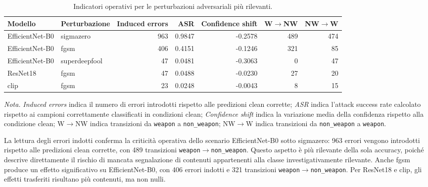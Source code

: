 \begin{table}[H]
\centering
\scriptsize
\setlength{\tabcolsep}{3.5pt}
\renewcommand{\arraystretch}{1.15}
\caption{Indicatori operativi per le perturbazioni adversariali più rilevanti.}
\label{tab:results-adversarial-operational-errors}
\begin{tabular}{@{}l l r r r r r@{}}
\toprule
\textbf{Modello} &
\textbf{Perturbazione} &
\textbf{Induced errors} &
\textbf{ASR} &
\textbf{Confidence shift} &
\textbf{W\(\rightarrow\)NW} &
\textbf{NW\(\rightarrow\)W} \\
\midrule
EfficientNet-B0 & \gls{sigmazero} & 963 & 0.9847 & -0.2578 & 489 & 474 \\
EfficientNet-B0 & \gls{fgsm} & 406 & 0.4151 & -0.1246 & 321 & 85 \\
EfficientNet-B0 & \gls{superdeepfool} & 47 & 0.0481 & -0.3063 & 0 & 47 \\
ResNet18 & \gls{fgsm} & 47 & 0.0488 & -0.0230 & 27 & 20 \\
\acrshort{clip} & \gls{fgsm} & 23 & 0.0248 & -0.0043 & 8 & 15 \\
\bottomrule
\end{tabular}

\vspace{0.4em}
\footnotesize
\textit{Nota.} \textit{Induced errors} indica il numero di errori introdotti
rispetto alle predizioni clean corrette; \textit{ASR} indica l'attack success
rate calcolato rispetto ai campioni correttamente classificati in condizioni
clean; \textit{Confidence shift} indica la variazione media della confidenza
rispetto alla condizione clean; W\(\rightarrow\)NW indica transizioni da
\texttt{weapon} a \texttt{non\_weapon}; NW\(\rightarrow\)W indica transizioni da
\texttt{non\_weapon} a \texttt{weapon}.
\end{table}

La lettura degli errori indotti conferma la criticità operativa dello scenario
EfficientNet-B0 sotto \gls{sigmazero}: 963 errori vengono introdotti rispetto
alle predizioni clean corrette, con 489 transizioni
\texttt{weapon}\(\rightarrow\)\texttt{non\_weapon}. Questo aspetto è più
rilevante della sola accuracy, poiché descrive direttamente il rischio di
mancata segnalazione di contenuti appartenenti alla classe investigativamente
rilevante. Anche \gls{fgsm} produce un effetto significativo su EfficientNet-B0,
con 406 errori indotti e 321 transizioni
\texttt{weapon}\(\rightarrow\)\texttt{non\_weapon}. Per ResNet18 e \gls{clip},
gli effetti trasferiti risultano più contenuti, ma non nulli.

